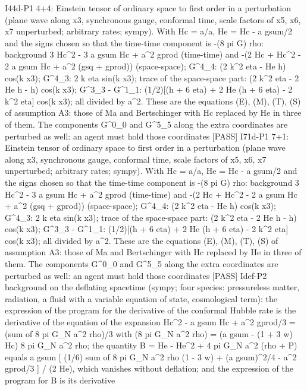 \documentclass[
  10pt,
]{article}
\newenvironment{Shaded}{}{}
\newcommand{\NormalTok}[1]{#1}
\begin{document}
\begin{Shaded}
\begin{Highlighting}[]
\NormalTok{[PASS] I44d{-}P1  4+4: Einstein tensor of ordinary space to first order in a perturbation (plane wave along x3, synchronous gauge, conformal time, scale factors of x5, x6, x7 unperturbed; arbitrary rates; sympy). With Hc = a\textquotesingle{}/a, He = Hc {-} a gsum/2 and the signs chosen so that the time{-}time component is {-}(8 pi G) rho: background 3 Hc\^{}2 {-} 3 a gsum Hc + a\^{}2 gprod (time{-}time) and {-}(2 Hc\textquotesingle{} + Hc\^{}2 {-} 2 a gsum Hc + a\^{}2 (gsq + gprod)) (space{-}space); G\^{}4\_4: (2 k\^{}2 eta {-} He h\textquotesingle{}) cos(k x3); G\^{}4\_3: 2 k eta\textquotesingle{} sin(k x3); trace of the space{-}space part: (2 k\^{}2 eta {-} 2 He h\textquotesingle{} {-} h\textquotesingle{}\textquotesingle{}) cos(k x3); G\^{}3\_3 {-} G\^{}1\_1: (1/2)[(h\textquotesingle{}\textquotesingle{} + 6 eta\textquotesingle{}\textquotesingle{}) + 2 He (h\textquotesingle{} + 6 eta\textquotesingle{}) {-} 2 k\^{}2 eta] cos(k x3); all divided by a\^{}2. These are the equations (E), (M), (T), (S) of assumption A3: those of Ma and Bertschinger with Hc replaced by He in three of them. The components G\^{}0\_0 and G\^{}5\_5 along the extra coordinates are perturbed as well: an agent must hold those coordinates}
\NormalTok{[PASS] I71d{-}P1  7+1: Einstein tensor of ordinary space to first order in a perturbation (plane wave along x3, synchronous gauge, conformal time, scale factors of x5, x6, x7 unperturbed; arbitrary rates; sympy). With Hc = a\textquotesingle{}/a, He = Hc {-} a gsum/2 and the signs chosen so that the time{-}time component is {-}(8 pi G) rho: background 3 Hc\^{}2 {-} 3 a gsum Hc + a\^{}2 gprod (time{-}time) and {-}(2 Hc\textquotesingle{} + Hc\^{}2 {-} 2 a gsum Hc + a\^{}2 (gsq + gprod)) (space{-}space); G\^{}4\_4: (2 k\^{}2 eta {-} He h\textquotesingle{}) cos(k x3); G\^{}4\_3: 2 k eta\textquotesingle{} sin(k x3); trace of the space{-}space part: (2 k\^{}2 eta {-} 2 He h\textquotesingle{} {-} h\textquotesingle{}\textquotesingle{}) cos(k x3); G\^{}3\_3 {-} G\^{}1\_1: (1/2)[(h\textquotesingle{}\textquotesingle{} + 6 eta\textquotesingle{}\textquotesingle{}) + 2 He (h\textquotesingle{} + 6 eta\textquotesingle{}) {-} 2 k\^{}2 eta] cos(k x3); all divided by a\^{}2. These are the equations (E), (M), (T), (S) of assumption A3: those of Ma and Bertschinger with Hc replaced by He in three of them. The components G\^{}0\_0 and G\^{}5\_5 along the extra coordinates are perturbed as well: an agent must hold those coordinates}
\NormalTok{[PASS] Idef{-}P2  background on the deflating spacetime (sympy; four species: pressureless matter, radiation, a fluid with a variable equation of state, cosmological term): the expression of the program for the derivative of the conformal Hubble rate is the derivative of the equation of the expansion Hc\^{}2 {-} a gsum Hc + a\^{}2 gprod/3 = (sum of 8 pi G\_N a\^{}2 rho)/3 with (8 pi G\_N a\^{}2 rho)\textquotesingle{} = (a gsum {-} (1 + 3 w) Hc) 8 pi G\_N a\^{}2 rho; the quantity B = He\textquotesingle{} {-} He\^{}2 + 4 pi G\_N a\^{}2 (rho + P) equals a gsum [ (1/6) sum of 8 pi G\_N a\^{}2 rho (1 {-} 3 w) + (a gsum)\^{}2/4 {-} a\^{}2 gprod/3 ] / (2 He), which vanishes without deflation; and the expression of the program for B\textquotesingle{} is its derivative}

\end{Highlighting}
\end{Shaded}
\end{document}
